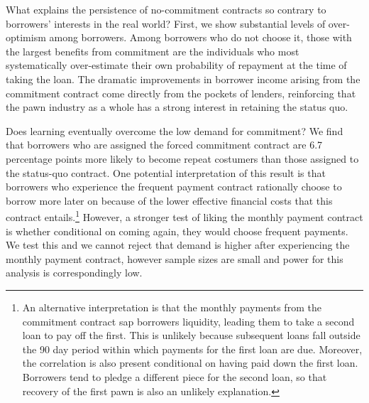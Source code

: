 \documentclass[oneside,11pt]{article}
\begin{document}
What explains the persistence of no-commitment contracts so contrary to borrowers’ interests in the real world?  First, we show substantial levels of over-optimism among borrowers. Among borrowers who do not choose it, those with the largest benefits from commitment are the individuals who most systematically over-estimate their own probability of repayment at the time of taking the loan.  The dramatic improvements in borrower income arising from the commitment contract come directly from the pockets of lenders, reinforcing that the pawn industry as a whole has a strong interest in retaining the status quo.


Does learning eventually overcome the low demand for commitment? 
We find that borrowers who are assigned the forced commitment contract are 6.7 percentage points more likely to become repeat costumers than those assigned to the status-quo contract. One potential interpretation of this result is that borrowers who experience the frequent payment contract rationally choose to borrow more later on because of the lower effective financial costs that this contract entails.\footnote{An alternative interpretation is that the monthly payments from the commitment contract sap borrowers liquidity, leading them to take a second loan to pay off the first. This is unlikely because subsequent loans fall outside the 90 day period within which payments for the first loan are due. Moreover, the correlation is also present conditional on having paid down the first loan. Borrowers tend to pledge a different piece for the second loan, so that recovery of the first pawn is also an unlikely explanation.} However, a stronger test of liking the monthly payment contract is whether conditional on coming again, they would choose frequent payments. We test this and we cannot reject that demand is higher after experiencing the monthly payment contract, however sample sizes are small and power for this analysis is correspondingly low.
\end{document}
